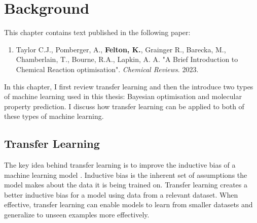\chapter{Background}\label{ch:background}

This chapter contains text published in the following paper:

\begin{enumerate}
\item Taylor C.J., Pomberger, A., \textbf{Felton, K.}, Grainger R., Barecka, M., Chamberlain, T., Bourne, R.A., Lapkin, A. A. "A Brief Introduction to Chemical Reaction optimisation". \textit{Chemical Reviews}. 2023.
\end{enumerate}

In this chapter, I first review transfer learning and then the introduce two types of machine learning used in this thesis: Bayesian optimisation and molecular property prediction. I discuss how transfer learning can be applied to both of these types of machine learning.

\section{Transfer Learning}

The key idea behind transfer learning is to improve the inductive bias of a machine learning model \cite{Zhuang2021}. Inductive bias is the inherent set of assumptions the model makes about the data it is being trained on. Transfer learning creates a better inductive bias for a model using data from a relevant dataset. When effective, transfer learning can enable models to learn from smaller datasets and generalize to unseen examples more effectively. 

